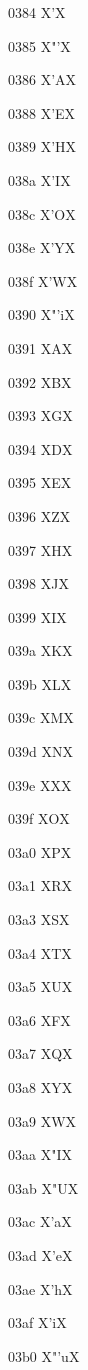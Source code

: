\documentclass[11pt]{article}
\begin{document}
0384 X{\textgreek{'}}X

0385 X{\textgreek{"'}}X

0386 X{\textgreek{'A}}X

0388 X{\textgreek{'E}}X

0389 X{\textgreek{'H}}X

038a X{\textgreek{'I}}X

038c X{\textgreek{'O}}X

038e X{\textgreek{'Y}}X

038f X{\textgreek{'W}}X

0390 X{\textgreek{"'i}}X

0391 X{\textgreek{A}}X

0392 X{\textgreek{B}}X

0393 X{\textgreek{G}}X

0394 X{\textgreek{D}}X

0395 X{\textgreek{E}}X

0396 X{\textgreek{Z}}X

0397 X{\textgreek{H}}X

0398 X{\textgreek{J}}X

0399 X{\textgreek{I}}X

039a X{\textgreek{K}}X

039b X{\textgreek{L}}X

039c X{\textgreek{M}}X

039d X{\textgreek{N}}X

039e X{\textgreek{X}}X

039f X{\textgreek{O}}X

03a0 X{\textgreek{P}}X

03a1 X{\textgreek{R}}X

03a3 X{\textgreek{S}}X

03a4 X{\textgreek{T}}X

03a5 X{\textgreek{U}}X

03a6 X{\textgreek{F}}X

03a7 X{\textgreek{Q}}X

03a8 X{\textgreek{Y}}X

03a9 X{\textgreek{W}}X

03aa X{\textgreek{"I}}X

03ab X{\textgreek{"U}}X

03ac X{\textgreek{'a}}X

03ad X{\textgreek{'e}}X

03ae X{\textgreek{'h}}X

03af X{\textgreek{'i}}X

03b0 X{\textgreek{"'u}}X
\end{document}

